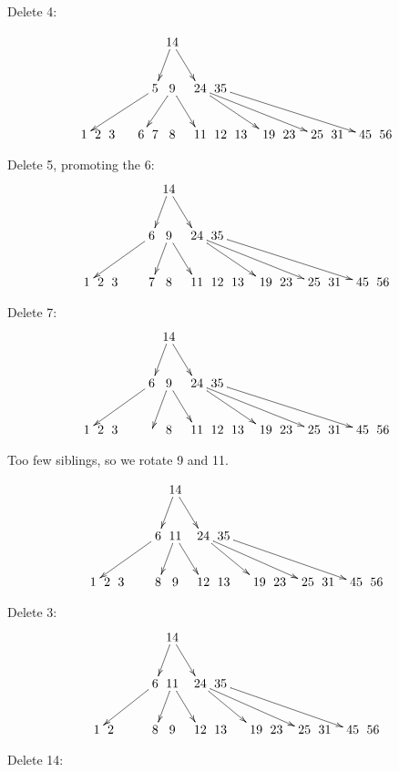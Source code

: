 \documentclass[a4paper]{article}
\begin{document}

Delete 4:

$$\xymatrix @C=0pt {
 &  &  &  &  &  &                &\ar[dl]14\ar[drr] \\
 &  &  &  &  &  & \ar[dllllll] 5  &\ar[dll] 9 \ar[drr] & &\ar[drrrr]           24 \ar[drrrrrrr] &  35 \ar[drrrrrrrrr] \\
 1 & 2 & 3& &  & 6 & 7  & 8 &                   & 11 & 12 & 13 &  & 19 &23 &  & 25 & 31 &  & 45 & 56\\
}$$

Delete 5, promoting the 6:
$$\xymatrix @C=0pt {
 &  &  &  &  &  &                &\ar[dl]14\ar[drr] \\
 &  &  &  &  &  & \ar[dllllll] 6  &\ar[dl] 9 \ar[drr] & &\ar[drrrr]           24 \ar[drrrrrrr] &  35 \ar[drrrrrrrrr] \\
 1 & 2 & 3& &  &  & 7  & 8 &                   & 11 & 12 & 13 &  & 19 &23 &  & 25 & 31 &  & 45 & 56\\
}$$


Delete 7:
$$\xymatrix @C=0pt {
 &  &  &  &  &  &                &\ar[dl]14\ar[drr] \\
 &  &  &  &  &  & \ar[dllllll] 6  &\ar[dl] 9 \ar[drr] & &\ar[drrrr]           24 \ar[drrrrrrr] &  35 \ar[drrrrrrrrr] \\
 1 & 2 & 3& &  &  &   & 8 &                   & 11 & 12 & 13 &  & 19 &23 &  & 25 & 31 &  & 45 & 56\\
}$$

Too few siblings, so we rotate 9 and 11.

$$\xymatrix @C=0pt {
 &  &  &  &  &  &                &\ar[dl]14\ar[drr] \\
 &  &  &  &  &  & \ar[dllllll] 6  &\ar[dl] 11 \ar[drr] & &\ar[drrrr]           24 \ar[drrrrrrr] &  35 \ar[drrrrrrrrr] \\
 1 & 2 & 3& &  &  &  8 & 9 &                   & 12 & 13 & &  & 19 &23 &  & 25 & 31 &  & 45 & 56\\
}$$


Delete 3:
$$\xymatrix @C=0pt {
 &  &  &  &  &  &                &\ar[dl]14\ar[drr] \\
 &  &  &  &  &  & \ar[dllllll] 6  &\ar[dl] 11 \ar[drr] & &\ar[drrrr]           24 \ar[drrrrrrr] &  35 \ar[drrrrrrrrr] \\
 1 & 2 & & &  &  &  8 & 9 &                   & 12 & 13 & &  & 19 &23 &  & 25 & 31 &  & 45 & 56\\
}$$

Delete 14:
\end{document}
